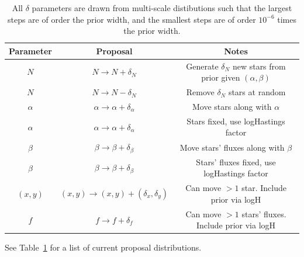 \documentclass[letterpaper, 11pt]{article}
\begin{document}
\begin{table}
\begin{center}
\begin{tabular}{c|c|c}
Parameter & Proposal & Notes\\
\hline
$N$ & $N \to N + \delta_N$ & Generate $\delta_N$ new stars from prior given
$(\alpha, \beta)$\\
$N$ & $N \to N - \delta_N$ & Remove $\delta_N$ stars at random\\
$\alpha$ & $\alpha \to \alpha + \delta_\alpha$ & Move stars along with $\alpha$
\\
$\alpha$ & $\alpha \to \alpha + \delta_\alpha$ & Stars fixed, use logHastings
factor \\
$\beta$ & $\beta \to \beta + \delta_\beta$ & Move stars' fluxes along with
$\beta$\\
$\beta$ & $\beta \to \beta + \delta_\beta$ & Stars' fluxes fixed, use
logHastings factor \\
$(x,y)$ & $(x,y) \to (x,y)+(\delta_x, \delta_y)$ & Can move $>1$ star.
Include prior via logH \\
$f$ & $f \to f + \delta_f$ & Can move $>1$ stars' fluxes. Include prior
via logH
\end{tabular}
\end{center}
\caption{All $\delta$ parameters are drawn from multi-scale distibutions such
that the largest steps are of order the prior width, and the smallest steps
are of order $10^{-6}$ times the prior width.\label{proposals}}
\end{table}

See Table~\ref{proposals} for a list of current proposal distributions.
\end{document}
